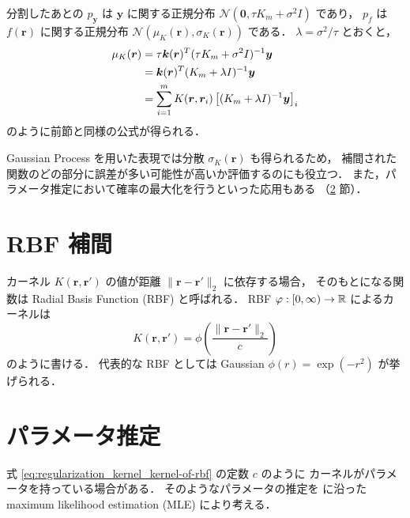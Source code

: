 分割したあとの
$p_{\bm{y}}$ は $\bm{y}$ に関する正規分布 $\mathcal{N}(\bm{0}, \tau K_m + \sigma^2 I)$ であり，
$p_f$ は $f(\bm{r})$ に関する正規分布 $\mathcal{N}(\mu_K(\bm{r}), \sigma_K(\bm{r}))$ である．
$\lambda = \sigma^2 / \tau$ とおくと，
\begin{align}
    \mu_K(\bm{r})
     & = \tau \bm{k}(\bm{r})^T (\tau K_m + \sigma^2 I)^{-1} \bm{y}
    \notag                                                                               \\
     & = \bm{k}(\bm{r})^T (K_m + \lambda I)^{-1} \bm{y}
    \notag                                                                               \\
     & = \sum_{i = 1}^m K(\bm{r}, \bm{r}_i) \left[(K_m + \lambda I)^{-1} \bm{y}\right]_i
\end{align}
のように前節と同様の公式が得られる．

Gaussian Process を用いた表現では分散 $\sigma_K(\bm{r})$ も得られるため，
補間された関数のどの部分に誤差が多い可能性が高いか評価するのにも役立つ．
また，パラメータ推定において確率の最大化を行うといった応用もある
（\ref{sec:regularization_kernel_param-est} 節）．

\section{RBF 補間}

カーネル $K(\bm{r}, \bm{r}')$ の値が距離 $\|\bm{r} - \bm{r}'\|_2$ に依存する場合，
そのもとになる関数は Radial Basis Function (RBF) と呼ばれる．
RBF $\varphi : [0, \infty) \to \mathbb{R}$ によるカーネルは
\begin{equation}
    K(\bm{r}, \bm{r}') = \phi\left(\frac{\|\bm{r} - \bm{r}'\|_2}{c}\right)
    \label{eq:regularization_kernel_kernel-of-rbf}
\end{equation}
のように書ける．
代表的な RBF としては Gaussian
$\phi(r) = \exp(-r^2)$
が挙げられる\cite{Brochu2010}．

\section{パラメータ推定}\label{sec:regularization_kernel_param-est}

式 \eqref{eq:regularization_kernel_kernel-of-rbf} の定数 $c$ のように
カーネルがパラメータを持っている場合がある．
そのようなパラメータの推定を
\cite[Remark 3 (Connection to spatial statistics)]{Scheuerer2011}
に沿った
maximum likelihood estimation (MLE)
により考える．

